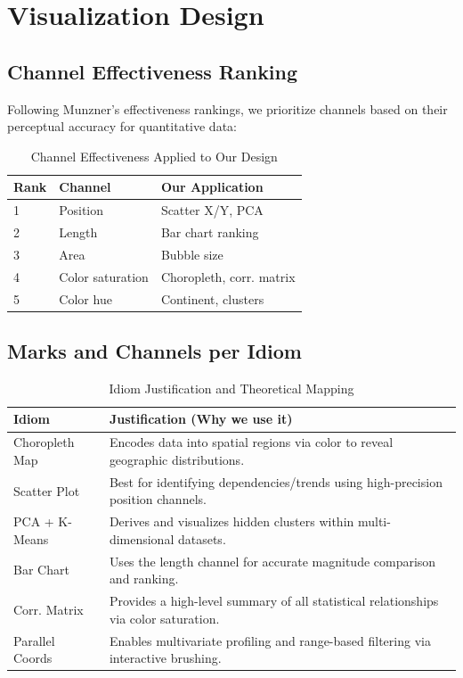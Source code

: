 \documentclass[conference]{IEEEtran}
\begin{document}
\section{Visualization Design}

{\color{blue}
\subsection{Channel Effectiveness Ranking}
Following Munzner's effectiveness rankings, we prioritize channels based on their perceptual accuracy for quantitative data:

\begin{table}[H]
\centering
\caption{Channel Effectiveness Applied to Our Design}
\small
\begin{tabular}{|p{0.8cm}|p{2.5cm}|p{4cm}|}
\hline
\textbf{Rank} & \textbf{Channel} & \textbf{Our Application} \\
\hline
1 & Position & Scatter X/Y, PCA \\
\hline
2 & Length & Bar chart ranking \\
\hline
3 & Area & Bubble size \\
\hline
4 & Color saturation & Choropleth, corr. matrix \\
\hline
5 & Color hue & Continent, clusters \\
\hline
\end{tabular}
\end{table}

\subsection{Marks and Channels per Idiom}

\begin{table}[H]
\centering
\caption{Idiom Justification and Theoretical Mapping}
\label{tab:idiom_justification}
\small
\begin{tabular}{|p{2.2cm}|p{5.5cm}|}
\hline
\textbf{Idiom} & \textbf{Justification (Why we use it)} \\
\hline
Choropleth Map & Encodes data into spatial regions via color to reveal geographic distributions. \\
\hline
Scatter Plot & Best for identifying dependencies/trends using high-precision position channels. \\
\hline
PCA + K-Means & Derives and visualizes hidden clusters within multi-dimensional datasets. \\
\hline
Bar Chart & Uses the length channel for accurate magnitude comparison and ranking. \\
\hline
Corr. Matrix & Provides a high-level summary of all statistical relationships via color saturation. \\
\hline
Parallel Coords & Enables multivariate profiling and range-based filtering via interactive brushing. \\
\hline
\end{tabular}
\end{table}

}
\end{document}
